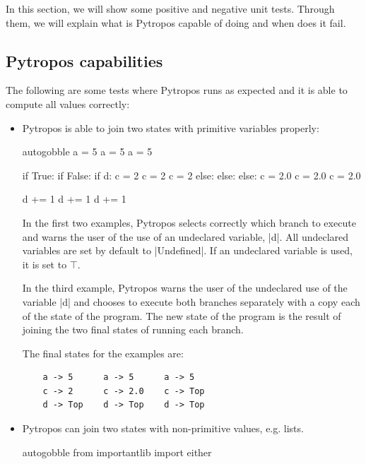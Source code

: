 In this section, we will show some positive and negative unit tests. Through them, we will
explain what is Pytropos capable of doing and when does it fail.

\subsection*{Pytropos capabilities}

The following are some tests where Pytropos runs as expected and it is able to compute all values correctly:

\begin{itemize}
\tightlist
\item Pytropos is able to join two states with primitive variables properly:

  \begin{pythoncode*}{autogobble}
  a = 5               a = 5               a = 5

  if True:            if False:           if d:
      c = 2               c = 2               c = 2
  else:               else:               else:
      c = 2.0             c = 2.0             c = 2.0

  d += 1              d += 1              d += 1
  \end{pythoncode*}

  In the first two examples, Pytropos selects correctly which branch to execute and warns
  the user of the use of an undeclared variable, \pycode|d|.  All undeclared variables are
  set by default to \pycode|Undefined|. If an undeclared variable is used, it is set to
  $\top$.

  In the third example, Pytropos warns the user of the undeclared use of the variable
  \pycode|d| and chooses to execute both branches separately with a copy each of the state
  of the program. The new state of the program is the result of joining the two final
  states of running each branch.

  The final states for the examples are:

  \begin{verbatim}
    a -> 5      a -> 5      a -> 5
    c -> 2      c -> 2.0    c -> Top
    d -> Top    d -> Top    d -> Top
  \end{verbatim}

\item Pytropos can join two states with non-primitive values, e.g. lists.

  \begin{pythoncode*}{autogobble}
    from importantlib import either


\end{pythoncode*}
\end{itemize}
